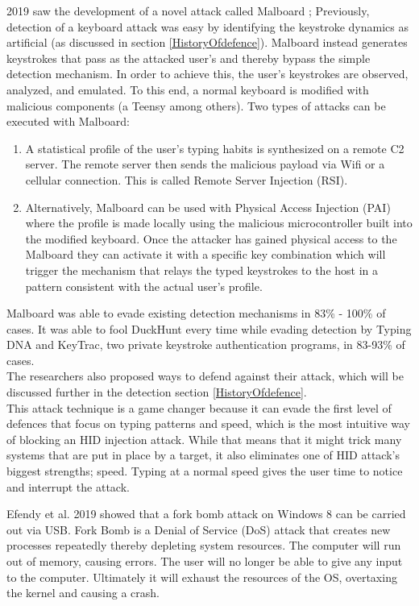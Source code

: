 \label{malboard}2019 saw the development of a novel attack called Malboard \cite{farhiMalboardNovelUser2019}; Previously, detection of a keyboard attack was easy by identifying the keystroke dynamics as artificial (as discussed in section \ref{HistoryOfdefence}). Malboard instead generates keystrokes that pass as the attacked user's and thereby bypass the simple detection mechanism. In order to achieve this, the user's keystrokes are observed, analyzed, and emulated. To this end, a normal keyboard is modified with malicious components (a Teensy among others).  Two types of attacks can be executed with Malboard: 
\begin{enumerate}
    \item A statistical profile of the user's typing habits is synthesized on a remote C2 server. The remote server then sends the malicious payload via Wifi or a cellular connection. This is called Remote Server Injection (RSI). 
    \item Alternatively, Malboard can be used with Physical Access Injection (PAI) where the profile is made locally using the malicious microcontroller built into the modified keyboard. Once the attacker has gained physical access to the Malboard they can activate it with a specific key combination which will trigger the mechanism that relays the typed keystrokes to the host in a pattern consistent with the actual user's profile.
 \end{enumerate}
 Malboard was able to evade existing detection mechanisms in 83\% - 100\% of cases. It was able to fool DuckHunt every time while evading detection by Typing DNA and KeyTrac, two private keystroke authentication programs, in 83-93\% of cases. \\
 The researchers also proposed ways to defend against their attack, which will be discussed further in the detection section \ref{HistoryOfdefence}. \\
 This attack technique is a game changer because it can evade the first level of defences that focus on typing patterns and speed, which is the most intuitive way of blocking an HID injection attack. While that means that it might trick many systems that are put in place by a target, it also eliminates one of HID attack's biggest strengths; speed. Typing at a normal speed gives the user time to notice and interrupt the attack.  


Efendy et al. 2019 \cite{efendyExploringPossibilityUSB2019} showed that a fork bomb attack on Windows 8 can be carried out via USB. Fork Bomb is a Denial of Service (DoS) attack that creates new processes repeatedly thereby depleting system resources. The computer will run out of memory, causing errors. The user will no longer be able to give any input to the computer. Ultimately it will exhaust the resources of the OS, overtaxing the kernel and causing a crash.  

